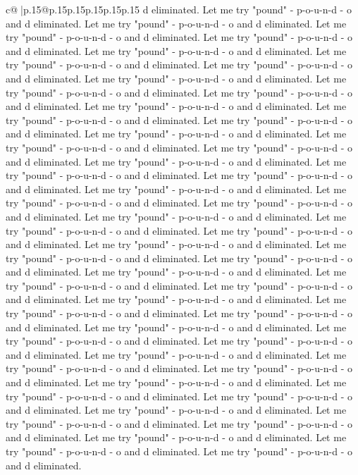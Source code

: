 \documentclass{article}
\begin{document}
{\begin{supertabular}{c@{$\;$}|p{.15\linewidth}@{}p{.15\linewidth}p{.15\linewidth}p{.15\linewidth}p{.15\linewidth}p{.15\linewidth}}
{{{d eliminated. Let me try "pound" {-} p{-}o{-}u{-}n{-}d {-} o and d eliminated. Let me try "pound" {-} p{-}o{-}u{-}n{-}d {-} o and d eliminated. Let me try "pound" {-} p{-}o{-}u{-}n{-}d {-} o and d eliminated. Let me try "pound" {-} p{-}o{-}u{-}n{-}d {-} o and d eliminated. Let me try "pound" {-} p{-}o{-}u{-}n{-}d {-} o and d eliminated. Let me try "pound" {-} p{-}o{-}u{-}n{-}d {-} o and d eliminated. Let me try "pound" {-} p{-}o{-}u{-}n{-}d {-} o and d eliminated. Let me try "pound" {-} p{-}o{-}u{-}n{-}d {-} o and d eliminated. Let me try "pound" {-} p{-}o{-}u{-}n{-}d {-} o and d eliminated. Let me try "pound" {-} p{-}o{-}u{-}n{-}d {-} o and d eliminated. Let me try "pound" {-} p{-}o{-}u{-}n{-}d {-} o and d eliminated. Let me try "pound" {-} p{-}o{-}u{-}n{-}d {-} o and d eliminated. Let me try "pound" {-} p{-}o{-}u{-}n{-}d {-} o and d eliminated. Let me try "pound" {-} p{-}o{-}u{-}n{-}d {-} o and d eliminated. Let me try "pound" {-} p{-}o{-}u{-}n{-}d {-} o and d eliminated. Let me try "pound" {-} p{-}o{-}u{-}n{-}d {-} o and d eliminated. Let me try "pound" {-} p{-}o{-}u{-}n{-}d {-} o and d eliminated. Let me try "pound" {-} p{-}o{-}u{-}n{-}d {-} o and d eliminated. Let me try "pound" {-} p{-}o{-}u{-}n{-}d {-} o and d eliminated. Let me try "pound" {-} p{-}o{-}u{-}n{-}d {-} o and d eliminated. Let me try "pound" {-} p{-}o{-}u{-}n{-}d {-} o and d eliminated. Let me try "pound" {-} p{-}o{-}u{-}n{-}d {-} o and d eliminated. Let me try "pound" {-} p{-}o{-}u{-}n{-}d {-} o and d eliminated. Let me try "pound" {-} p{-}o{-}u{-}n{-}d {-} o and d eliminated. Let me try "pound" {-} p{-}o{-}u{-}n{-}d {-} o and d eliminated. Let me try "pound" {-} p{-}o{-}u{-}n{-}d {-} o and d eliminated. Let me try "pound" {-} p{-}o{-}u{-}n{-}d {-} o and d eliminated. Let me try "pound" {-} p{-}o{-}u{-}n{-}d {-} o and d eliminated. Let me try "pound" {-} p{-}o{-}u{-}n{-}d {-} o and d eliminated. Let me try "pound" {-} p{-}o{-}u{-}n{-}d {-} o and d eliminated. Let me try "pound" {-} p{-}o{-}u{-}n{-}d {-} o and d eliminated. Let me try "pound" {-} p{-}o{-}u{-}n{-}d {-} o and d eliminated. Let me try "pound" {-} p{-}o{-}u{-}n{-}d {-} o and d eliminated. Let me try "pound" {-} p{-}o{-}u{-}n{-}d {-} o and d eliminated. Let me try "pound" {-} p{-}o{-}u{-}n{-}d {-} o and d eliminated. Let me try "pound" {-} p{-}o{-}u{-}n{-}d {-} o and d eliminated. Let me try "pound" {-} p{-}o{-}u{-}n{-}d {-} o and d eliminated. Let me try "pound" {-} p{-}o{-}u{-}n{-}d {-} o and d eliminated. Let me try "pound" {-} p{-}o{-}u{-}n{-}d {-} o and d eliminated. Let me try "pound" {-} p{-}o{-}u{-}n{-}d {-} o and d eliminated. Let me try "pound" {-} p{-}o{-}u{-}n{-}d {-} o and d eliminated. Let me try "pound" {-} p{-}o{-}u{-}n{-}d {-} o and d eliminated. Let me try "pound" {-} p{-}o{-}u{-}n{-}d {-} o and d eliminated. Let me try "pound" {-} p{-}o{-}u{-}n{-}d {-} o and d eliminated. Let me try "pound" {-} p{-}o{-}u{-}n{-}d {-} o and d eliminated. Let me try "pound" {-} p{-}o{-}u{-}n{-}d {-} o and d eliminated. Let me try "pound" {-} p{-}o{-}u{-}n{-}d {-} o and d eliminated. Let me try "pound" {-} p{-}o{-}u{-}n{-}d {-} o and d eliminated. Let me try "pound" {-} p{-}o{-}u{-}n{-}d {-} o and d eliminated. }}}
\end{supertabular}}
\end{document}
